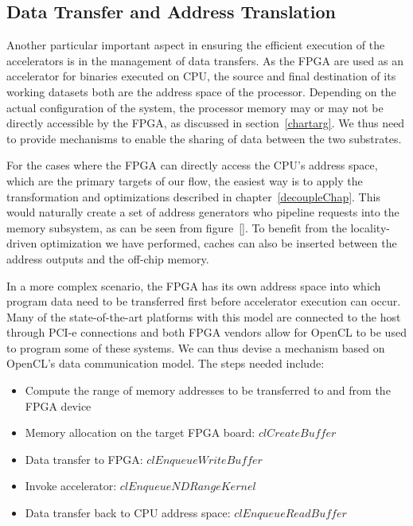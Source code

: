 \subsection{Data Transfer and Address Translation}
\label{dtransfer}
Another particular important aspect in ensuring the efficient execution of the accelerators is in the management of data transfers. %
As the FPGA are used as an accelerator for binaries executed on CPU, the source
and final destination of its working datasets both are the address space of
the processor. Depending on the actual configuration of the system, the processor memory may or may not be directly accessible by the FPGA, as discussed in section~\ref{chartarg}. We thus need to provide mechanisms to enable
the sharing of data between the two substrates.


For the cases where the FPGA can directly access the 
CPU's address space, which are the primary targets of our flow, the easiest way is to apply the transformation and
optimizations described in chapter~\ref{decoupleChap}. This would
naturally create a set of address generators who pipeline requests into the 
memory subsystem, as can be seen from figure~\ref{}. To benefit from the locality-driven optimization we 
have performed, caches can also be inserted between the address outputs and the
off-chip memory. 

In a more complex scenario, the FPGA has its own address space into which program data need to be transferred first before accelerator execution can occur. 
Many of the state-of-the-art platforms with this model
are connected to the host through PCI-e connections and both FPGA vendors allow for
OpenCL to be used to program some of these systems. We can thus devise
a mechanism based on OpenCL's data communication model. 
The steps needed include: 
\begin{itemize}
    \item Compute the range of memory addresses to be transferred to and from the FPGA device
    \item Memory allocation on the target FPGA board: $clCreateBuffer$ 
    \item Data transfer to FPGA: $clEnqueueWriteBuffer$
    \item Invoke accelerator: $clEnqueueNDRangeKernel$
    \item Data transfer back to CPU address space: $clEnqueueReadBuffer$
\end{itemize} 


